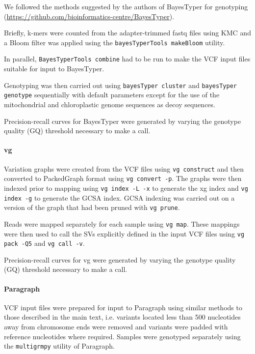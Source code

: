\documentclass[12pt]{article}
\begin{document}
We followed the methods suggested by the authors of BayesTyper for genotyping (\url{https://github.com/bioinformatics-centre/BayesTyper}).

Briefly, k-mers were counted from the adapter-trimmed fastq files using KMC \citep{kmc} and a Bloom filter was applied using the \texttt{bayesTyperTools makeBloom} utility.

In parallel, \texttt{BayesTyperTools combine} had to be run to make the VCF input files suitable for input to BayesTyper.

Genotyping was then carried out using \texttt{bayesTyper cluster} and \texttt{bayesTyper genotype} sequentially with default parameters except for the use of the mitochondrial and chloroplastic genome sequences as decoy sequences.

Precision-recall curves for BayesTyper were generated by varying the genotype quality (GQ) threshold necessary to make a call.

\paragraph{vg}

Variation graphs were created from the VCF files using \texttt{vg construct} and then converted to PackedGraph format using \texttt{vg convert -p}. 
The graphs were then indexed prior to mapping using \texttt{vg index -L -x} to generate the xg index and \texttt{vg index -g} to generate the GCSA index. 
GCSA indexing was carried out on a version of the graph that had been pruned with \texttt{vg prune}.

Reads were mapped separately for each sample using \texttt{vg map}. 
These mappings were then used to call the SVs explicitly defined in the input VCF files using \texttt{vg pack -Q5} and \texttt{vg call -v}.

Precision-recall curves for vg were generated by varying the genotype quality (GQ) threshold necessary to make a call.

\paragraph{Paragraph}

VCF input files were prepared for input to Paragraph using similar methods to those described in the main text, i.e. variants located less than 500 nucleotides away from chromosome ends were removed and variants were padded with reference nucleotides where required. 
Samples were genotyped separately using the \texttt{multigrmpy} utility of Paragraph.
\end{document}
